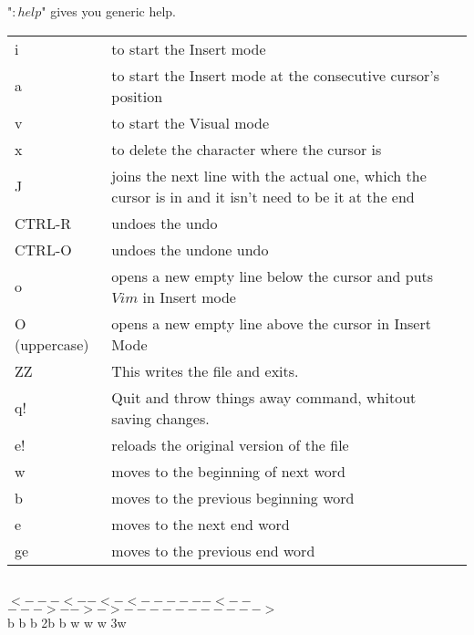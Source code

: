 \documentclass[11p]{book}
\begin{document}
"$:help$" gives you generic help. \\

\begin{tabular}{p{2.5cm} p{13cm}}
i & to start the Insert mode \\
a & to start the Insert mode at the consecutive cursor's position\\
v & to start the Visual mode \\
x & to delete the character where the cursor is \\
J & joins the next line with the actual one, which the cursor is in and it isn't need to be it at the end \\
CTRL-R & undoes the undo \\
CTRL-O & undoes the undone undo \\
o & opens a new empty line below the cursor and puts $Vim$ in Insert mode \\
O (uppercase) & opens a new empty line above the cursor in Insert Mode \\
ZZ & This writes the file and exits. \\
q! & Quit and throw things away command, whitout saving changes. \\
e! & reloads the original version of the file \\
\hline
w & moves to the beginning of next word \\
b & moves to the previous beginning word \\
e & moves to the next end word \\
ge & moves to the previous end word \\
\end{tabular} \\

$<---<--<-<------<--$ \hspace*{1cm} $--->-->->----------->$ \\
\hspace*{1.5cm} b \hspace{0.78cm}b \hspace*{0.5cm} b \hspace*{1cm} 2b \hspace*{1.2cm} b \hspace*{1.5cm} w \hspace*{0.8cm} w \hspace*{0.4cm} w \hspace*{1.5cm} 3w \\
\end{document}
